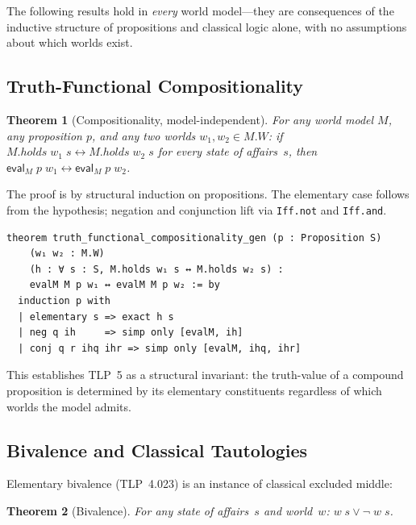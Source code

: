 \documentclass[10pt, letterpaper]{article}
\newtheorem{theorem}{Theorem}[section]
\theoremstyle{definition}
\theoremstyle{remark}
\newcommand{\eval}{\mathsf{eval}}
\begin{document}
The following results hold in \emph{every} world model---they
are consequences of the inductive structure of propositions and
classical logic alone, with no assumptions about which worlds
exist.

\subsection{Truth-Functional Compositionality}
\label{sec:compositionality}

\begin{theorem}[Compositionality, model-independent]
\label{thm:compositionality}
For any world model $M$, any proposition $p$, and any two
worlds $w_1, w_2 \in M.W$: if $M.\mathit{holds}\;w_1\;s
\leftrightarrow M.\mathit{holds}\;w_2\;s$ for every state of
affairs~$s$, then $\eval_M\;p\;w_1 \leftrightarrow
\eval_M\;p\;w_2$.
\end{theorem}

\noindent
The proof is by structural induction on propositions.
The elementary case follows from the hypothesis; negation and
conjunction lift via \texttt{Iff.not} and \texttt{Iff.and}.

\begin{lstlisting}
theorem truth_functional_compositionality_gen (p : Proposition S)
    (w₁ w₂ : M.W)
    (h : ∀ s : S, M.holds w₁ s ↔ M.holds w₂ s) :
    evalM M p w₁ ↔ evalM M p w₂ := by
  induction p with
  | elementary s => exact h s
  | neg q ih     => simp only [evalM, ih]
  | conj q r ihq ihr => simp only [evalM, ihq, ihr]
\end{lstlisting}

\noindent
This establishes TLP~5 as a structural invariant: the
truth-value of a compound proposition is determined by its
elementary constituents regardless of which worlds the model
admits.

\subsection{Bivalence and Classical Tautologies}
\label{sec:bivalence}

Elementary bivalence (TLP~4.023) is an instance of classical
excluded middle:

\begin{theorem}[Bivalence]
For any state of affairs~$s$ and world~$w$: $w\;s \lor \lnot\;w\;s$.
\end{theorem}
\end{document}
